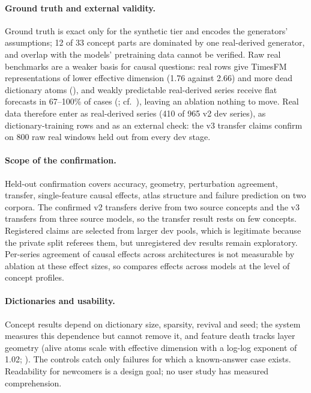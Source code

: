 \paragraph{Ground truth and external validity.} Ground truth is exact only for the synthetic tier and encodes the
generators' assumptions; 12 of 33 concept parts are dominated by one real-derived generator, and overlap with the models'
pretraining data cannot be verified. Raw real benchmarks are a weaker basis for causal questions: real rows give TimesFM
representations of lower effective dimension (1.76 against 2.66) and more dead dictionary atoms (), and weakly
predictable real-derived series receive flat forecasts in 67--100\% of cases (; cf.\ \citealp{wan2026collapse}),
leaving an ablation nothing to move. Real data therefore enter as real-derived series (410 of 965 v2 dev series), as
dictionary-training rows and as an external check: the v3 transfer claims confirm on 800 raw real windows held out from
every dev stage.

\paragraph{Scope of the confirmation.} Held-out confirmation covers accuracy, geometry, perturbation agreement, transfer,
single-feature causal effects, atlas structure and failure prediction on two corpora. The confirmed v2 transfers derive
from two source concepts and the v3 transfers from three source models, so the transfer result rests on few concepts.
Registered claims are selected from larger dev pools, which is legitimate because the private split referees them, but
unregistered dev results remain exploratory. Per-series agreement of causal effects across architectures is not
measurable by ablation at these effect sizes, so \tool{} compares effects across models at the level of concept
profiles.

\paragraph{Dictionaries and usability.} Concept results depend on dictionary size, sparsity, revival and seed; the system
measures this dependence but cannot remove it, and feature death tracks layer geometry (alive atoms scale with effective
dimension with a log-log exponent of 1.02; ). The controls catch only failures for which a known-answer case
exists. Readability for newcomers is a design goal; no user study has measured comprehension.

